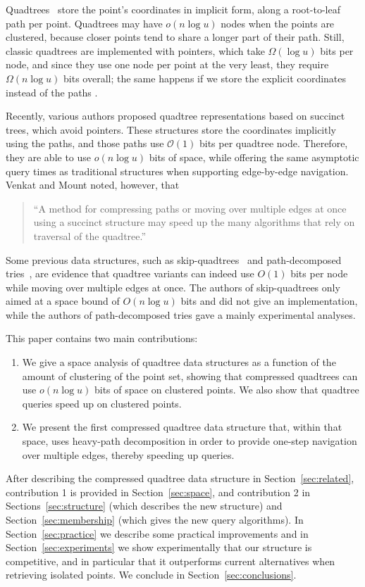 \documentclass{elsarticle}
\newcommand{\Oh}[1]
  {\ensuremath{\mathcal{O}\!\left( {#1} \right)}}
\begin{document}
Quadtrees~\cite{Mor66,Sam06} store the point's coordinates in implicit form, along a root-to-leaf path per point. Quadtrees may have \(o (n \log u)\) nodes when the points are clustered, because closer points tend to share a longer part of their path. Still, classic quadtrees are implemented with pointers, which take $\Omega(\log u)$ bits per node, and since they use one node per point at the very least, they require \(\Omega (n \log u)\) bits overall; the same happens if we store the explicit coordinates instead of the paths \cite{Gar82}.  

Recently, various authors \cite{BLN14,VM14,BCBNP20} proposed quadtree representations based on succinct trees, which avoid pointers. These structures store the coordinates implicitly using the paths, and those paths use $\Oh{1}$ bits per quadtree node. Therefore, they are able to use $o(n\log u)$ bits of space, while offering the same asymptotic query times as traditional structures when supporting edge-by-edge navigation. Venkat and Mount \cite{VM14} noted, however, that
\begin{quotation}
``A method for compressing paths or moving over multiple edges at once using a succinct structure may speed up the many algorithms that rely on traversal of the quadtree.''
\end{quotation}
Some previous data structures, such as skip-quadtrees~\cite{EGS08} and path-decomposed tries~\cite{GO14}, are evidence that quadtree variants can indeed use $O (1)$ bits per node while moving over multiple edges at once. The authors of skip-quadtrees only aimed at a space bound of $O (n \log u)$ bits and did not give an implementation, while the authors of path-decomposed tries gave a mainly experimental analyses.

This paper contains two main contributions:
\begin{enumerate}
    \item We give a space analysis of quadtree data structures as a function of the amount of clustering of the point set, showing that compressed quadtrees can use $o(n\log u)$ bits of space on clustered points. We also show that quadtree queries speed up on clustered points.
    \item We present the first compressed quadtree data structure that, within that space, uses heavy-path decomposition in order to provide one-step navigation over multiple edges, thereby speeding up queries.
\end{enumerate}

After describing the compressed quadtree data structure in Section~\ref{sec:related},
contribution 1 is provided in Section~\ref{sec:space}, and contribution 2 in Sections~\ref{sec:structure} (which describes the new structure) and Section~\ref{sec:membership} (which gives the new query algorithms).  In Section~\ref{sec:practice} we describe some practical improvements and in Section~\ref{sec:experiments} we show experimentally that our structure is competitive, and in particular that it outperforms current alternatives when retrieving isolated points. We conclude in
Section~\ref{sec:conclusions}.
\end{document}
